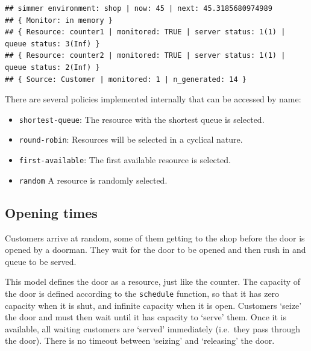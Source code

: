 \documentclass[
]{book}
\begin{document}
\begin{verbatim}
## simmer environment: shop | now: 45 | next: 45.3185680974989
## { Monitor: in memory }
## { Resource: counter1 | monitored: TRUE | server status: 1(1) | queue status: 3(Inf) }
## { Resource: counter2 | monitored: TRUE | server status: 1(1) | queue status: 2(Inf) }
## { Source: Customer | monitored: 1 | n_generated: 14 }
\end{verbatim}

There are several policies implemented internally
that can be accessed by name:

\begin{itemize}
\item
  \texttt{shortest-queue}: The resource with the shortest queue is selected.
\item
  \texttt{round-robin}: Resources will be selected in a cyclical nature.
\item
  \texttt{first-available}: The first available resource is selected.
\item
  \texttt{random} A resource is randomly selected.
\end{itemize}

\hypertarget{opening-times}{%
\subsection{Opening times}\label{opening-times}}

Customers arrive at random, some of them getting to the shop before the door is opened by a doorman. They wait for the door to be opened and then rush in and queue to be served.

This model defines the door as a resource, just like the counter. The capacity of the door is defined according to the \texttt{schedule} function, so that it has zero capacity when it is shut, and infinite capacity when it is open. Customers `seize' the door and must then wait until it has capacity to `serve' them. Once it is available, all waiting customers are `served' immediately (i.e.~they pass through the door). There is no timeout between `seizing' and `releasing' the door.
\end{document}
